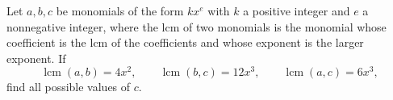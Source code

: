 Let $a,b,c$ be monomials of the form $kx^e$ with $k$ a positive integer and $e$ a nonnegative integer, where the lcm of two monomials is the monomial whose coefficient is the lcm of the coefficients and whose exponent is the larger exponent. If
\[
\operatorname{lcm}(a,b)=4x^2,\qquad\operatorname{lcm}(b,c)=12x^3,\qquad\operatorname{lcm}(a,c)=6x^3,
\]
find all possible values of $c$.
